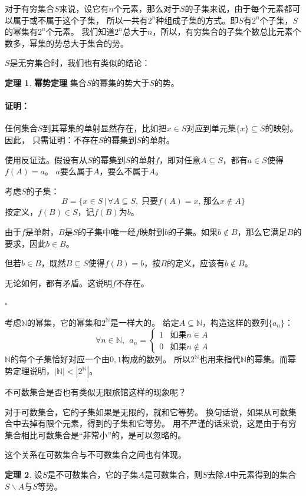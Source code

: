 \documentclass[12pt,UTF8]{ctexbook}
\theoremstyle{definition}
\newtheorem{tm}{定理}[section]
\theoremstyle{plain}
\renewenvironment{proof}{\paragraph{\textbf{证明：}}}{\hfill$\square$}
\begin{document}
对于有穷集合$S$来说，设它有$n$个元素，那么对于$S$的子集来说，由于每个元素都可以属于或不属于这个子集，
所以一共有$2^n$种组成子集的方式。即$S$有$2^n$个子集，$S$的幂集有$2^n$个元素。
我们知道$2^n$总大于$n$，所以，有穷集合的子集个数总比元素个数多，幂集的势总大于集合的势。

$S$是无穷集合时，我们也有类似的结论：
\begin{tm}{\textbf{幂势定理}}
    集合$S$的幂集的势大于$S$的势。
\end{tm}

\begin{proof}
    任何集合$S$到其幂集的单射显然存在，比如把$x\in S$对应到单元集$\{x\}\subseteq S$的映射。因此，
    只需证明：不存在$S$的幂集到$S$的单射。
    
    使用反证法。假设有从$S$的幂集到$S$的单射$f$，即对任意$A\subseteq S$，都有$a\in S$使得$f(A) = a$。
    $a$要么属于$A$，要么不属于$A$。

    考虑$S$的子集：
    $$ B = \{x\in S \, | \, \forall A\subseteq S,\;\mbox{只要} f(A) = x,\,\mbox{那么} x\notin A\}$$
    按定义，$f(B)\in S$，记$f(B)$为$b$。
    
    由于$f$是单射，$B$是$S$的子集中唯一经$f$映射到$b$的子集。如果$b\notin B$，那么它满足$B$的要求，因此$b\in B$。

    但若$b\in B$，既然$B\subseteq S$使得$f(B)=b$，按$B$的定义，应该有$b \notin B$。

    无论如何，都有矛盾。这说明$f$不存在。

\end{proof}

考虑$\mathbb{N}$的幂集，它的幂集和$2^\mathbb{N}$是一样大的。
给定$A\subseteq \mathbb{N}$，构造这样的数列$\{a_n\}$：
$$\forall n \in \mathbb{N},\;\,
a_n = \begin{cases}
    1 & \mbox{如果} n \in A \\
    0 & \mbox{如果} n \notin A
\end{cases}
$$
$\mathbb{N}$的每个子集恰好对应一个由$0,1$构成的数列。
所以$2^\mathbb{N}$也用来指代$\mathbb{N}$的幂集。而幂势定理说明，$|\mathbb{N}| < |2^\mathbb{N}|$。

不可数集合是否也有类似无限旅馆这样的现象呢？

对于可数集合，它的子集如果是无限的，就和它等势。
换句话说，如果从可数集合中去掉有限个元素，得到的子集和它等势。
用不严谨的话来说，这是由于有穷集合相比可数集合是“非常小”的，是可以忽略的。

这个关系在可数集合与不可数集合之间也有体现。

\begin{tm}
    设$S$是不可数集合，它的子集$A$是可数集合，则$S$去除$A$中元素得到的集合$S\backslash A$与$S$等势。
\end{tm}
\end{document}
